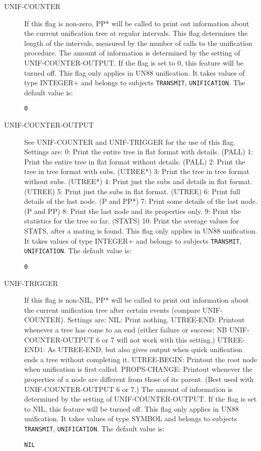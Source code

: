 \begin{description}
\item[UNIF-COUNTER]  
If this flag is non-zero, PP* will be called to 
print out information about the current unification tree at 
regular intervals. This flag determines the length of
the intervals, measured by the number of calls to the
unification procedure. The amount of information is
determined by the setting of UNIF-COUNTER-OUTPUT.
If the flag is set to 0, this feature will be turned off.
This flag only applies in UN88 unification.
It takes values of type INTEGER+ and belongs to subjects \texttt{TRANSMIT}, \texttt{UNIFICATION}.  The default value is: \begin{lstlisting}
0
\end{lstlisting}

\item[UNIF-COUNTER-OUTPUT]  
See UNIF-COUNTER and UNIF-TRIGGER for the use of this flag.
Settings are:
0: Print the entire tree in flat format with details. (PALL)
1: Print the entire tree in flat format without details. (PALL)
2: Print the tree in tree format with subs. (UTREE*)
3: Print the tree in tree format without subs. (UTREE*)
4: Print just the subs and details in flat format. (UTREE)
5: Print just the subs in flat format. (UTREE)
6: Print full details of the last node. (P and PP*)
7: Print some details of the last node. (P and PP)
8: Print the last node and its properties only.
9: Print the statistics for the tree so far. (STATS)
10: Print the average values for STATS, after a mating is found.
This flag only applies in UN88 unification.
It takes values of type INTEGER+ and belongs to subjects \texttt{TRANSMIT}, \texttt{UNIFICATION}.  The default value is: \begin{lstlisting}
0
\end{lstlisting}

\item[UNIF-TRIGGER]  
If this flag is non-NIL, PP* will be called to 
print out information about the current unification tree 
after certain events (compare UNIF-COUNTER).
Settings are:
NIL: Print nothing.
UTREE-END: Printout whenever a tree has come to an end
  (either failure or success; NB UNIF-COUNTER-OUTPUT 6 or 7
   will not work with this setting.)
UTREE-END1: As UTREE-END, but also gives output when quick
  unification ends a tree without completing it.
UTREE-BEGIN: Printout the root node when unification is
  first called.
PROPS-CHANGE: Printout whenever the properties of a node 
  are different from those of its parent. (Best used with
  UNIF-COUNTER-OUTPUT 6 or 7.) 
The amount of information is determined by the setting of 
UNIF-COUNTER-OUTPUT. If the flag is set to NIL, this 
feature will be turned off.
This flag only applies in UN88 unification.
It takes values of type SYMBOL and belongs to subjects \texttt{TRANSMIT}, \texttt{UNIFICATION}.  The default value is: \begin{lstlisting}
NIL
\end{lstlisting}


\end{description}
